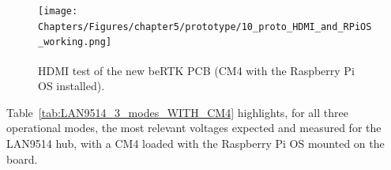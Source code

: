 \begin{figure}[h]
	\centering
	\texttt{[image: Chapters/Figures/chapter5/prototype/10\_proto\_HDMI\_and\_RPiOS\_working.png]}
	\caption{HDMI test of the new beRTK\textsuperscript{\textregistered} PCB (CM4 with the Raspberry Pi OS installed).}
	\label{fig:10_proto_HDMI_and_RPiOS_working}
\end{figure}%

Table~\ref{tab:LAN9514_3_modes_WITH_CM4} highlights, for all three operational modes, the most relevant voltages expected and measured for the LAN9514 hub, with a CM4 loaded with the Raspberry Pi OS mounted on the board.

\begingroup
\begin{table}[h]
	\caption{LAN9514 and downstream ports circuits' most relevant voltages expected and measured, for all operational modes, with the CM4 mounted on the prototype.}
	\label{tab:LAN9514_3_modes_WITH_CM4}
	\centering
\end{table}
